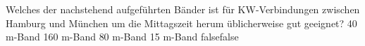     {Welches der nachstehend aufgeführten Bänder ist für KW-Verbindungen zwischen Hamburg und München um die Mittagszeit herum üblicherweise gut geeignet?}
    {40 m-Band}
    {160 m-Band}
    {80 m-Band}
    {15 m-Band}
    {false}{false}